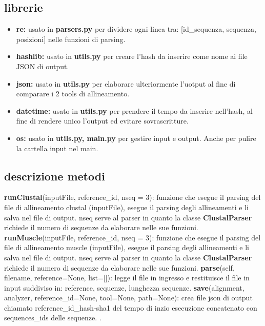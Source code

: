 \documentclass[12pt]{article}
\begin{document}
	\subsection{librerie}
		\begin{itemize}
			\item\textbf{re:} usato in \textbf{parsers.py} per dividere ogni linea tra: [id\_sequenza, sequenza, posizioni] nelle funzioni di parsing.
			\item\textbf{hashlib:} usato in \textbf{utils.py} per creare l'hash da inserire come nome ai file JSON di output.
			\item\textbf{json:} usato in \textbf{utils.py} per elaborare ulteriormente l'uotput al fine di comparare i 2 tools di allineamento.
			\item\textbf{datetime:} usato in \textbf{utils.py} per prendere il tempo da inserire nell'hash, al fine di rendere unico l'output ed evitare sovrascritture.
			\item\textbf{os:} usato in \textbf{utils.py, main.py} per gestire input e output. Anche per pulire la cartella input nel main.
		\end{itemize}
	\subsection{descrizione metodi}
		\textbf{runClustal}(inputFile, reference\_id, nseq = 3): funzione che esegue il parsing del file di allineamento clustal (inputFile), esegue il parsing degli allineamenti e li salva nel file di output. \newline nseq serve al parser in quanto la classe \textbf{ClustalParser} richiede il numero di sequenze da elaborare nelle sue funzioni.\newline
		\textbf{runMuscle}(inputFile, reference\_id, nseq = 3): funzione che esegue il parsing del file di allineamento muscle (inputFile), esegue il parsing degli allineamenti e li salva nel file di output. \newline nseq serve al parser in quanto la classe \textbf{ClustalParser} richiede il numero di sequenze da elaborare nelle sue funzioni.\newline
		\textbf{parse}(self, filename, reference=None, list=[]):  legge il file in ingresso e restituisce il file in input suddiviso in: reference, sequenze, lunghezza sequenze.\newline
		\textbf{save}(alignment, analyzer, reference\_id=None, tool=None, path=None): crea file json di output chiamato reference\_id\_hash-sha1 del tempo di inzio esecuzione concatenato con sequences\_ids delle sequenze.
		.\newline
		
\end{document}
